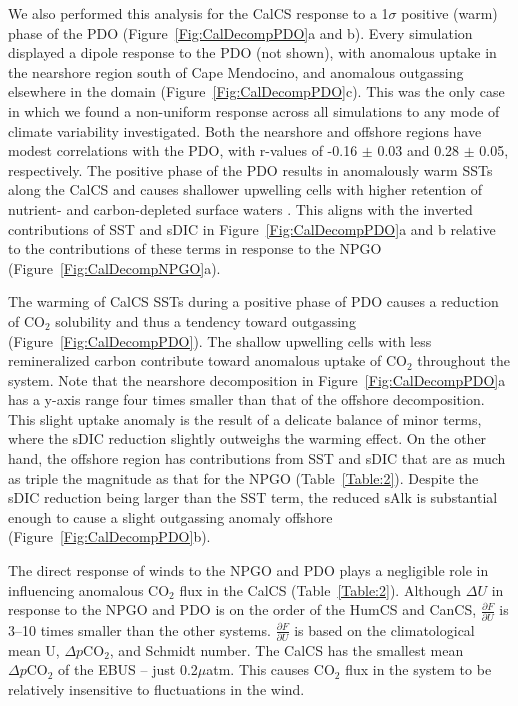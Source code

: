 \documentclass[hvmath, online,bgd]{copernicus_discussions}
\begin{document}
We also performed this analysis for the CalCS response to a 1$\sigma$ positive (warm) phase of the PDO (Figure~\ref{Fig:CalDecompPDO}a and b). Every simulation displayed a dipole response to the PDO (not shown), with anomalous uptake in the nearshore region south of Cape Mendocino, and anomalous outgassing elsewhere in the domain (Figure~\ref{Fig:CalDecompPDO}c). This was the only case in which we found a non-uniform response across all simulations to any mode of climate variability investigated. Both the nearshore and offshore regions have modest correlations with the PDO, with r-values of -0.16 $\pm$ 0.03 and 0.28 $\pm$ 0.05, respectively. The positive phase of the PDO results in anomalously warm SSTs along the CalCS and causes shallower upwelling cells with higher retention of nutrient- and carbon-depleted surface waters \citep{Chhak:2007}. This aligns with the inverted contributions of SST and sDIC in Figure~\ref{Fig:CalDecompPDO}a and b relative to the contributions of these terms in response to the NPGO (Figure~\ref{Fig:CalDecompNPGO}a). 

The warming of CalCS SSTs during a positive phase of PDO causes a reduction of CO$_{2}$ solubility and thus a tendency toward outgassing (Figure~\ref{Fig:CalDecompPDO}). The shallow upwelling cells with less remineralized carbon contribute toward anomalous uptake of CO$_{2}$ throughout the system. Note that the nearshore decomposition in Figure~\ref{Fig:CalDecompPDO}a has a y-axis range four times smaller than that of the offshore decomposition. This slight uptake anomaly is the result of a delicate balance of minor terms, where the sDIC reduction slightly outweighs the warming effect. On the other hand, the offshore region has contributions from SST and sDIC that are as much as triple the magnitude as that for the NPGO (Table~\ref{Table:2}). Despite the sDIC reduction being larger than the SST term, the reduced sAlk is substantial enough to cause a slight outgassing anomaly offshore (Figure~\ref{Fig:CalDecompPDO}b).

The direct response of winds to the NPGO and PDO plays a negligible role in influencing anomalous CO$_{2}$ flux in the CalCS (Table~\ref{Table:2}). Although $\Delta U$ in response to the NPGO and PDO is on the order of the HumCS and CanCS, $\frac{\partial F}{\partial U}$ is 3--10 times smaller than the other systems. $\frac{\partial F}{\partial U}$ is based on the climatological mean U, $\Delta p\mathrm{CO}_{2}$, and Schmidt number. The CalCS has the smallest mean $\Delta p\mathrm{CO}_{2}$ of the EBUS -- just 0.2$\mu$atm. This causes CO$_{2}$ flux in the system to be relatively insensitive to fluctuations in the wind.
\end{document}
